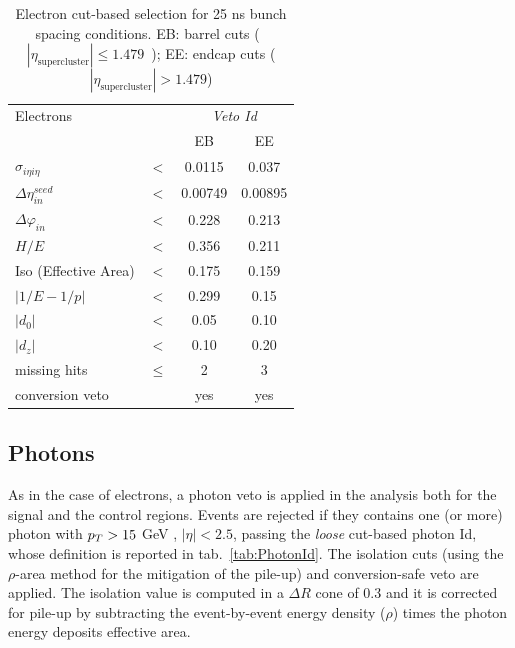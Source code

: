 \begin{table}[htb]
 \centering
\caption{Electron cut-based selection for 25 ns bunch spacing conditions. EB: barrel cuts (~$|\eta_\text{supercluster}| \leq 1.479$~); EE: endcap cuts ( $|\eta_\text{supercluster}| > 1.479$)}
    \begin{tabular}{l|ccc}
    Electrons                   &        & \multicolumn{2}{c}{\emph{Veto Id}}\\
                                &        & EB      & EE     \\
 \hline
 \hline
    $\sigma_{i\eta i\eta} $     & $ < $  &0.0115   &0.037  \\
    $\Delta \eta_{in}^{seed}$   & $ < $  &0.00749  &0.00895 \\
    $\Delta \varphi_{in} $      & $ < $  &0.228    &0.213   \\
    $H/E $                      & $ < $  &0.356    &0.211   \\
    Iso (Effective Area)                 & $<$    &0.175    &0.159   \\
    $|1/E - 1/p|$               & $ < $  &0.299    &0.15    \\
    $|d_0|$                     & $ < $  &0.05     &0.10   \\
    $|d_z|$                     & $ < $  &0.10     &0.20   \\
    missing hits                & $\leq$ &2        &3       \\
    conversion veto             &        &  yes    &yes     \\
    
\end{tabular}

\label{tab:EGcutBar}
\end{table}


\subsection{Photons}
As in the case of electrons, a photon veto is applied in the analysis both for the signal and the control regions. Events are rejected if they contains one (or more) photon with $p_T > 15$ GeV , $|\eta| < 2.5$, passing the \emph{loose} cut-based photon Id, whose definition is reported in tab.~\ref{tab:PhotonId}. The isolation cuts (using the $\rho$-area method for the mitigation of the pile-up) and conversion-safe veto are applied. The isolation value is computed in a $\Delta R$ cone of 0.3 and it is corrected for pile-up by subtracting the event-by-event energy density ($\rho$) times the photon energy deposits effective area.

